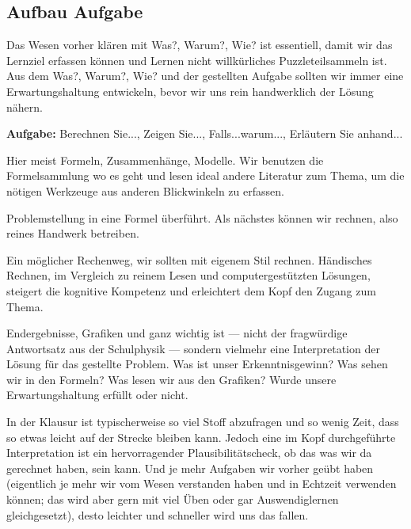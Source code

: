 \documentclass[11pt,a4paper,DIV=12]{scrartcl}
\numberwithin{equation}{section}
\numberwithin{figure}{section}
\begin{document}
\subsection*{Aufbau Aufgabe}
\begin{Ziel}
Das Wesen vorher klären mit Was?, Warum?, Wie? ist essentiell, damit wir das
Lernziel erfassen können und Lernen nicht willkürliches Puzzleteilsammeln ist.
Aus dem Was?, Warum?, Wie? und der gestellten Aufgabe sollten wir immer eine
Erwartungshaltung entwickeln, bevor wir uns rein handwerklich der Lösung nähern.
\end{Ziel}
\textbf{Aufgabe:} Berechnen Sie..., Zeigen Sie..., Falls...warum..., Erläutern
Sie anhand...
\begin{Werkzeug}
Hier meist Formeln, Zusammenhänge, Modelle. Wir benutzen die Formelsammlung
wo es geht und lesen ideal andere Literatur zum Thema, um die nötigen Werkzeuge
aus anderen Blickwinkeln zu erfassen.
\end{Werkzeug}
\begin{Ansatz}
Problemstellung in eine Formel überführt. Als nächstes können wir rechnen, also
reines Handwerk betreiben.
\end{Ansatz}
\begin{ExCalc}
Ein möglicher Rechenweg, wir sollten mit eigenem Stil
rechnen.
Händisches Rechnen, im Vergleich zu reinem Lesen und computergestützten Lösungen,
steigert die kognitive Kompetenz und erleichtert dem Kopf den Zugang zum Thema.
\end{ExCalc}
\begin{Loesung}
Endergebnisse, Grafiken und ganz wichtig ist --- nicht der fragwürdige Antwortsatz
aus der Schulphysik --- sondern vielmehr eine Interpretation der Lösung
für das gestellte Problem. Was ist unser Erkenntnisgewinn? Was sehen wir in den
Formeln? Was lesen wir aus den Grafiken? Wurde unsere Erwartungshaltung erfüllt
oder nicht.

In der Klausur ist typischerweise so viel Stoff abzufragen und so wenig Zeit,
dass so etwas leicht auf der Strecke bleiben kann. Jedoch eine im Kopf
durchgeführte Interpretation ist ein hervorragender Plausibilitätscheck, ob das was
wir da gerechnet haben, sein kann. Und je mehr Aufgaben wir
vorher geübt haben (eigentlich je mehr wir vom Wesen verstanden haben und in
Echtzeit verwenden können; das wird aber gern mit viel Üben oder gar
Auswendiglernen gleichgesetzt),
desto leichter und schneller wird uns das fallen.
\end{Loesung}


\setcounter{section}{0}  %




%
\cite{*}
\newpage

\end{document}
